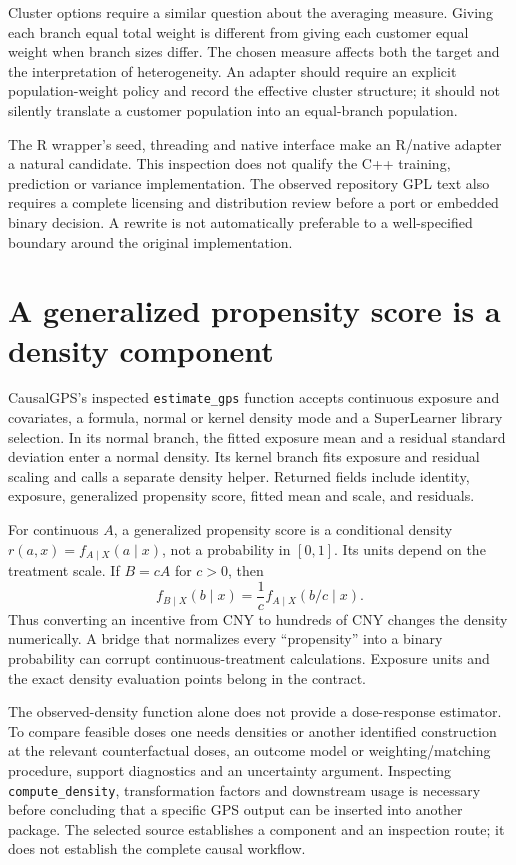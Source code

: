 Cluster options require a similar question about the averaging measure. Giving
each branch equal total weight is different from giving each customer equal
weight when branch sizes differ. The chosen measure affects both the target
and the interpretation of heterogeneity. An adapter should require an explicit
population-weight policy and record the effective cluster structure; it should
not silently translate a customer population into an equal-branch population.

The R wrapper's seed, threading and native interface make an R/native adapter
a natural candidate. This inspection does not qualify the C++ training,
prediction or variance implementation. The observed repository GPL text also
requires a complete licensing and distribution review before a port or embedded
binary decision. A rewrite is not automatically preferable to a well-specified
boundary around the original implementation.\cite{v13_sw_grf}

\section{A generalized propensity score is a density component}

CausalGPS's inspected \texttt{estimate\_gps} function accepts continuous
exposure and covariates, a formula, normal or kernel density mode and a
SuperLearner library selection. In its normal branch, the fitted exposure mean
and a residual standard deviation enter a normal density. Its kernel branch
fits exposure and residual scaling and calls a separate density helper. Returned
fields include identity, exposure, generalized propensity score, fitted mean
and scale, and residuals.\cite{v13_sw_causalgps}

For continuous $A$, a generalized propensity score is a conditional density
$r(a,x)=f_{A\mid X}(a\mid x)$, not a probability in $[0,1]$. Its units depend
on the treatment scale. If $B=cA$ for $c>0$, then
\[
 f_{B\mid X}(b\mid x)=\frac1c f_{A\mid X}(b/c\mid x).
\]
Thus converting an incentive from CNY to hundreds of CNY changes the density
numerically. A bridge that normalizes every ``propensity'' into a binary
probability can corrupt continuous-treatment calculations. Exposure units and
the exact density evaluation points belong in the contract.

The observed-density function alone does not provide a dose-response estimator.
To compare feasible doses one needs densities or another identified construction
at the relevant counterfactual doses, an outcome model or weighting/matching
procedure, support diagnostics and an uncertainty argument. Inspecting
\texttt{compute\_density}, transformation factors and downstream usage is
necessary before concluding that a specific GPS output can be inserted into
another package. The selected source establishes a component and an inspection
route; it does not establish the complete causal workflow.

